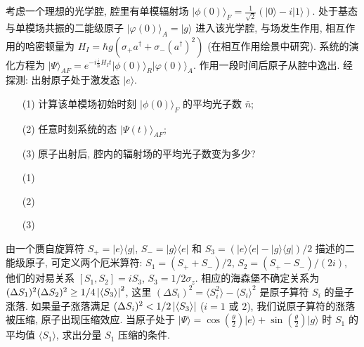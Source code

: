 \documentclass{assignment}
\begin{document}
\begin{prob}
    考虑一个理想的光学腔, 腔里有单模辐射场 $\lvert\phi(0)\rangle_F=\frac{1}{\sqrt{2}}(\lvert 0\rangle-i\lvert 1\rangle)$. 处于基态与单模场共振的二能级原子 $\lvert\varphi(0)\rangle_A=\lvert g\rangle$ 进入该光学腔, 与场发生作用, 相互作用的哈密顿量为 $H_I=\hbar g(\sigma_+a^{\dagger}+\sigma_-(a^{\dagger})^2)$ (在相互作用绘景中研究). 系统的演化方程为 $\lvert\Psi\rangle_{AF}=e^{-i\frac{i}{\hbar}H_It}\lvert\phi(0)\rangle_R\lvert\varphi(0)\rangle_A$. 作用一段时间后原子从腔中逸出. 经探测: 出射原子处于激发态 $\lvert e\rangle$.
    \begin{itemize}
        \item[(1)] 计算该单模场初始时刻 $\lvert\phi(0)\rangle_F$ 的平均光子数 $\bar{n}$;
        \item[(2)] 任意时刻系统的态 $\lvert\Psi(t)\rangle_{AF}$;
        \item[(3)] 原子出射后, 腔内的辐射场的平均光子数变为多少?
    \end{itemize}
\end{prob}
\begin{sol}
    \begin{itemize}
        \item[(1)] 
        \item[(2)] 
        \item[(3)] 
    \end{itemize}
\end{sol}

\begin{prob}
    由一个赝自旋算符 $S_+=\lvert e\rangle\langle g\rvert$, $S_-=\lvert g\rangle\langle e\rvert$ 和 $S_3=(\lvert e\rangle\langle e\rvert-\lvert g\rangle\langle g\rvert)/2$ 描述的二能级原子, 可定义两个厄米算符: $S_1=(S_++S_-)/2$, $S_2=(S_+-S_-)/(2i)$, 他们的对易关系 $[S_1,S_2]=iS_3$, $S_3=1/2\sigma_z$. 相应的海森堡不确定关系为 $(\Delta S_1)^2(\Delta S_2)^2\geq 1/4\left\lvert\langle S_3\rangle\right\rvert^2$, 这里 $(\Delta S_i)^2=\langle S_i^2\rangle-\langle S_i\rangle^2$ 是原子算符 $S_i$ 的量子涨落. 如果量子涨落满足 $(\Delta S_i)^2<1/2\left\lvert\langle S_3\rangle\right\rvert$ ($i=1$ 或 $2$), 我们说原子算符的涨落被压缩, 原子出现压缩效应. 当原子处于 $\lvert\Psi\rangle=\cos(\frac{\theta}{2})\lvert e\rangle+\sin(\frac{\theta}{2})\lvert g\rangle$ 时 $S_1$ 的平均值 $\langle S_1\rangle$, 求出分量 $S_1$ 压缩的条件.
\end{prob}
\begin{sol}
    
\end{sol}
\end{document}
